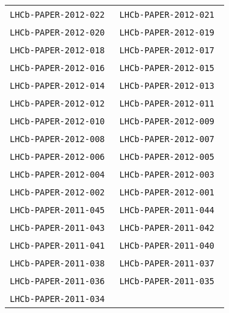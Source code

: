 \begin{center}
\begin{longtable}{ll}
\texttt{LHCb-PAPER-2012-022}~\cite{LHCb-PAPER-2012-022} & 
\texttt{LHCb-PAPER-2012-021}~\cite{LHCb-PAPER-2012-021} \\
\texttt{LHCb-PAPER-2012-020}~\cite{LHCb-PAPER-2012-020} & 
\texttt{LHCb-PAPER-2012-019}~\cite{LHCb-PAPER-2012-019} \\
\texttt{LHCb-PAPER-2012-018}~\cite{LHCb-PAPER-2012-018} & 
\texttt{LHCb-PAPER-2012-017}~\cite{LHCb-PAPER-2012-017} \\
\texttt{LHCb-PAPER-2012-016}~\cite{LHCb-PAPER-2012-016} & 
\texttt{LHCb-PAPER-2012-015}~\cite{LHCb-PAPER-2012-015} \\
\texttt{LHCb-PAPER-2012-014}~\cite{LHCb-PAPER-2012-014} & 
\texttt{LHCb-PAPER-2012-013}~\cite{LHCb-PAPER-2012-013} \\
\texttt{LHCb-PAPER-2012-012}~\cite{LHCb-PAPER-2012-012} & 
\texttt{LHCb-PAPER-2012-011}~\cite{LHCb-PAPER-2012-011} \\
\texttt{LHCb-PAPER-2012-010}~\cite{LHCb-PAPER-2012-010} & 
\texttt{LHCb-PAPER-2012-009}~\cite{LHCb-PAPER-2012-009} \\
\texttt{LHCb-PAPER-2012-008}~\cite{LHCb-PAPER-2012-008} & 
\texttt{LHCb-PAPER-2012-007}~\cite{LHCb-PAPER-2012-007} \\
\texttt{LHCb-PAPER-2012-006}~\cite{LHCb-PAPER-2012-006} & 
\texttt{LHCb-PAPER-2012-005}~\cite{LHCb-PAPER-2012-005} \\
\texttt{LHCb-PAPER-2012-004}~\cite{LHCb-PAPER-2012-004} & 
\texttt{LHCb-PAPER-2012-003}~\cite{LHCb-PAPER-2012-003} \\
\texttt{LHCb-PAPER-2012-002}~\cite{LHCb-PAPER-2012-002} & 
\texttt{LHCb-PAPER-2012-001}~\cite{LHCb-PAPER-2012-001} \\
\hline
\texttt{LHCb-PAPER-2011-045}~\cite{LHCb-PAPER-2011-045} & 
\texttt{LHCb-PAPER-2011-044}~\cite{LHCb-PAPER-2011-044} \\
\texttt{LHCb-PAPER-2011-043}~\cite{LHCb-PAPER-2011-043} & 
\texttt{LHCb-PAPER-2011-042}~\cite{LHCb-PAPER-2011-042} \\
\texttt{LHCb-PAPER-2011-041}~\cite{LHCb-PAPER-2011-041} & 
\texttt{LHCb-PAPER-2011-040}~\cite{LHCb-PAPER-2011-040} \\
\texttt{LHCb-PAPER-2011-038}~\cite{LHCb-PAPER-2011-038} &
\texttt{LHCb-PAPER-2011-037}~\cite{LHCb-PAPER-2011-037} \\
\texttt{LHCb-PAPER-2011-036}~\cite{LHCb-PAPER-2011-036} &
\texttt{LHCb-PAPER-2011-035}~\cite{LHCb-PAPER-2011-035} \\
\texttt{LHCb-PAPER-2011-034}~\cite{LHCb-PAPER-2011-034} &

\end{longtable}
\end{center}
